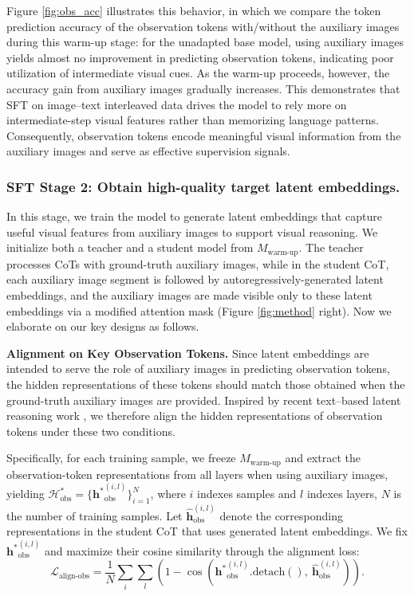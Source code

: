 Figure \ref{fig:obs_acc} illustrates this behavior, in which we compare the token prediction accuracy of the observation tokens with/without the auxiliary images during this warm-up stage: for the unadapted base model, using auxiliary images yields almost no improvement in predicting observation tokens, indicating poor utilization of intermediate visual cues. As the warm-up proceeds, however, the accuracy gain from auxiliary images gradually increases. This demonstrates that SFT on image–text interleaved data drives the model to rely more on intermediate-step visual features rather than memorizing language patterns. Consequently, observation tokens encode meaningful visual information from the auxiliary images and serve as effective supervision signals.



\subsubsection{SFT Stage 2: Obtain high-quality target latent embeddings.} In this stage, we train the model to generate latent embeddings that capture useful visual features from auxiliary images to support visual reasoning. We initialize both a teacher and a student model from $M_{\text{warm-up}}$. The teacher processes CoTs with ground-truth auxiliary images, while in the student CoT, each auxiliary image segment is followed by autoregressively-generated latent embeddings, and the auxiliary images are made visible only to these latent embeddings via a modified attention mask (Figure \ref{fig:method} right). Now we elaborate on our key designs as follows.

\textbf{Alignment on Key Observation Tokens.} Since latent embeddings are intended to serve the role of auxiliary images in predicting observation tokens, the hidden representations of these tokens should match those obtained when the ground-truth auxiliary images are provided. Inspired by recent text–based latent reasoning work \citep{shen2025codi, wang2025synadapt}, we therefore align the hidden representations of observation tokens under these two conditions.

Specifically, for each training sample, we freeze $M_{\text{warm-up}}$ and extract the observation-token representations from all layers when using auxiliary images, yielding $\mathcal{H}_{\text{obs}}^*=\{\mathbf{h^*}^{(i,l)}_{\text{obs}}\}_{i=1}^N$, where $i$ indexes samples and $l$ indexes layers, $N$ is the number of training samples. Let $\hat{\mathbf{h}}^{(i,l)}_{\text{obs}}$ denote the corresponding representations in the student CoT that uses generated latent embeddings. We fix $\mathbf{h^*}^{(i,l)}_{\text{obs}}$ and maximize their cosine similarity through the alignment loss:
\begin{equation}
    \mathcal{L}_{\text{align-obs}} = \frac{1}{N}\sum_i \sum_l \left(1-\cos ({\mathbf{h^*}^{(i, l)}_{\text{obs}}}.\operatorname{detach()}, ~{\hat{\mathbf{h}}^{(i, l)}_{\text{obs}}}) \right).
\end{equation}
 

